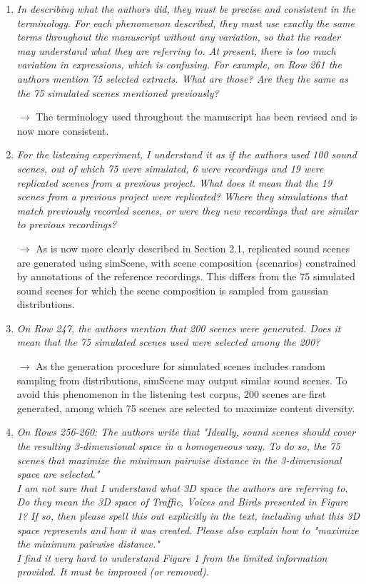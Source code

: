 \documentclass[10pt]{article}
\begin{document}
\begin{enumerate}
\item \emph{In describing what the authors did, they must be precise and consistent in the terminology. For each phenomenon described, they must use exactly the same terms throughout the manuscript without any variation, so that the reader may understand what they are referring to. At present, there is too much variation in expressions, which is confusing. For example, on Row 261 the authors mention 75 selected extracts. What are those? Are they the same as the 75 simulated scenes mentioned previously?}

$\rightarrow$ The terminology used throughout the manuscript has been revised and is now more consistent.

\item \emph{For the listening experiment, I understand it as if the authors used 100 sound scenes, out of which 75 were simulated, 6 were recordings and 19 were replicated scenes from a previous project. What does it mean that the 19 scenes from a previous project were replicated? Where they simulations that match previously recorded scenes, or were they new recordings that are similar to previous recordings?}

$\rightarrow$ As is now more clearly described in Section 2.1, replicated sound scenes are generated using simScene, with scene composition (scenarios) constrained by annotations of the reference recordings. This differs from the 75 simulated sound scenes for which the scene composition is sampled from gaussian distributions.

\item \emph{On Row 247, the authors mention that 200 scenes were generated. Does it mean that the 75 simulated scenes used were selected among the 200?}

$\rightarrow$ As the generation procedure for simulated scenes includes random sampling from distributions, simScene may output similar sound scenes. To avoid this phenomenon in the listening test corpus, 200 scenes are first generated, among which 75 scenes are selected to maximize content diversity.

\item \emph{On Rows 256-260: The authors write that "Ideally, sound scenes should cover the resulting 3-dimensional space in a homogeneous way. To do so, the 75 scenes that maximize the minimum pairwise distance in the 3-dimensional space are selected."\\
I am not sure that I understand what 3D space the authors are referring to. Do they mean the 3D space of Traffic, Voices and Birds presented in Figure 1? If so, then please spell this out explicitly in the text, including what this 3D space represents and how it was created. Please also explain how to "maximize the minimum pairwise distance."\\
I find it very hard to understand Figure 1 from the limited information provided. It must be improved (or removed).}


\end{enumerate}
\end{document}
